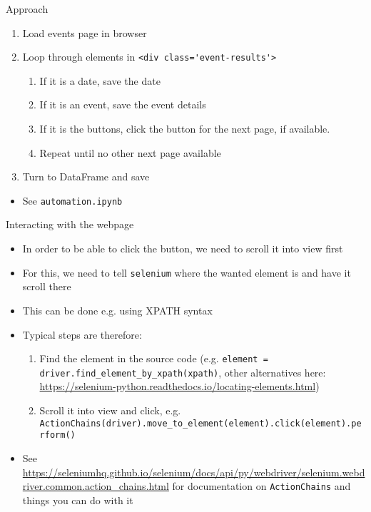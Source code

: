 \begin{frame}[fragile]{Approach}
\begin{enumerate}
	\item Load events page in browser
	\item Loop through elements in \verb!<div class='event-results'>!
	\begin{enumerate}
		\item If it is a date, save the date
		\item If it is an event, save the event details
		\item If it is the buttons, click the button for the next page, if available.
	    \item Repeat until no other next page available
	\end{enumerate}
	\item Turn to DataFrame and save
\end{enumerate}
\begin{itemize}
	\item See \verb!automation.ipynb!
\end{itemize}
\end{frame}

\begin{frame}[fragile]{Interacting with the webpage}
\begin{itemize}
	\item In order to be able to click the button, we need to scroll it into view first
	\item For this, we need to tell \verb!selenium! where the wanted element is and have it scroll there
	\item This can be done e.g. using XPATH syntax
	\item Typical steps are therefore:
	\begin{enumerate}
		\item Find the element in the source code (e.g. \verb!element = driver.find_element_by_xpath(xpath)!, other alternatives here: \url{https://selenium-python.readthedocs.io/locating-elements.html})
		\item Scroll it into view and click, e.g. \verb!ActionChains(driver).move_to_element(element).click(element).perform()!
	\end{enumerate}
	\item See \url{https://seleniumhq.github.io/selenium/docs/api/py/webdriver/selenium.webdriver.common.action_chains.html} for documentation on \verb!ActionChains! and things you can do with it 
\end{itemize}
\end{frame}


